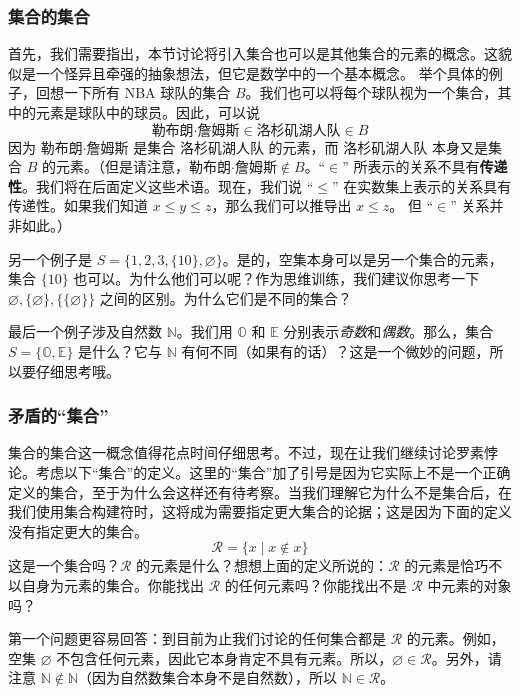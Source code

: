\subsubsection*{集合的集合}

首先，我们需要指出，本节讨论将引入集合也可以是其他集合的元素的概念。这貌似是一个怪异且牵强的抽象想法，但它是数学中的一个基本概念。
举个具体的例子，回想一下所有 NBA 球队的集合 $B$。我们也可以将每个球队视为一个集合，其中的元素是球队中的球员。因此，可以说
\[\text{勒布朗·詹姆斯} \in \text{洛杉矶湖人队} \in B\]
因为 $\text{勒布朗·詹姆斯}$ 是集合 $\text{洛杉矶湖人队}$ 的元素，而 $\text{洛杉矶湖人队}$ 本身又是集合 $B$ 的元素。（但是请注意，$\text{勒布朗·詹姆斯} \notin B$。``$\in$'' 所表示的关系不具有\textbf{传递性}。我们将在后面定义这些术语。现在，我们说 ``$\le$'' 在实数集上表示的关系具有传递性。如果我们知道 $x \le y \le z$，那么我们可以推导出 $x \le z$。 但 ``$\in$'' 关系并非如此。）

另一个例子是 $S = \{1, 2, 3, \{10\}, \varnothing \}$。是的，空集本身可以是另一个集合的元素，集合 $\{10\}$ 也可以。为什么他们可以呢？作为思维训练，我们建议你思考一下 $\varnothing, \{\varnothing\}, \{\{\varnothing\}\}$ 之间的区别。为什么它们是不同的集合？

最后一个例子涉及自然数 $\mathbb{N}$。我们用 $\mathbb{O}$ 和 $\mathbb{E}$ 分别表示\textit{奇数}和\textit{偶数}。那么，集合 $S = \{\mathbb{O}, \mathbb{E}\}$ 是什么？它与 $\mathbb{N}$ 有何不同（如果有的话）？这是一个微妙的问题，所以要仔细思考哦。

\subsubsection*{矛盾的``集合''}

集合的集合这一概念值得花点时间仔细思考。不过，现在让我们继续讨论罗素悖论。考虑以下``集合''的定义。这里的``集合''加了引号是因为它实际上不是一个正确定义的集合，至于为什么会这样还有待考察。当我们理解它为什么不是集合后，在我们使用集合构建符时，这将成为需要指定更大集合的论据；这是因为下面的定义没有指定更大的集合。
\[\mathcal{R} = \{x \mid x \notin x\}\]
这是一个集合吗？$\mathcal{R}$ 的元素是什么？想想上面的定义所说的：$\mathcal{R}$ 的元素是恰巧不以自身为元素的集合。你能找出 $\mathcal{R}$ 的任何元素吗？你能找出不是 $\mathcal{R}$ 中元素的对象吗？

第一个问题更容易回答：到目前为止我们讨论的任何集合都是 $\mathcal{R}$ 的元素。例如，空集 $\varnothing$ 不包含任何元素，因此它本身肯定不具有元素。所以，$\varnothing \in \mathcal{R}$。另外，请注意 $\mathbb{N} \notin \mathbb{N}$（因为自然数集合本身不是自然数），所以 $\mathbb{N} \in \mathcal{R}$。

